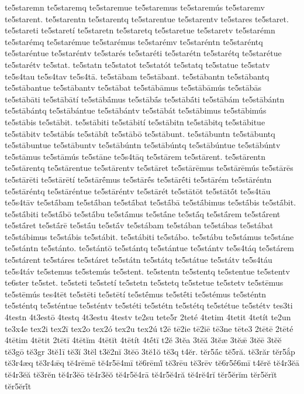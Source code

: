 {te5staremn
te5staremq
te5staremue
te5staremus
te5staremús
te5staremv
te5starent.
te5starentn
te5starentq
te5starentue
te5starentv
te5stares
te5staret.
te5stareti
te5staretí
te5staretn
te5staretq
te5staretue
te5staretv
te5starémn
te5starémq
te5starémue
te5starémus
te5starémv
te5staréntn
te5staréntq
te5staréntue
te5staréntv
te5starés
te5staréti
te5starétn
te5starétq
te5starétue
te5starétv
te5stat.
te5statn
te5statot
te5statót
te5statq
te5statue
te5statv
te5s4tau
te5s4tav
te5s4tā.
te5stābam
te5stābant.
te5stābantn
te5stābantq
te5stābantue
te5stābantv
te5stābat
te5stābāmus
te5stābāmús
te5stābās
te5stābāti
te5stābātí
te5stābā́mus
te5stābā́s
te5stābā́ti
te5stābám
te5stābántn
te5stābántq
te5stābántue
te5stābántv
te5stābát
te5stābimus
te5stābimús
te5stābis
te5stābit.
te5stābiti
te5stābití
te5stābitn
te5stābitq
te5stābitue
te5stābitv
te5stābís
te5stābít
te5stābō
te5stābunt.
te5stābuntn
te5stābuntq
te5stābuntue
te5stābuntv
te5stābúntn
te5stābúntq
te5stābúntue
te5stābúntv
te5stāmus
te5stāmús
te5stāne
te5s4tāq
te5stārem
te5stārent.
te5stārentn
te5stārentq
te5stārentue
te5stārentv
te5stāret
te5stārēmus
te5stārēmús
te5stārēs
te5stārēti
te5stārētí
te5stārḗmus
te5stārḗs
te5stārḗti
te5stārém
te5stāréntn
te5stāréntq
te5stāréntue
te5stāréntv
te5stārét
te5stātōt
te5stātṓt
te5s4tāu
te5s4tāv
te5stā́bam
te5stā́ban
te5stā́bat
te5stā́bā
te5stā́bimus
te5stā́bis
te5stā́bit.
te5stā́biti
te5stā́bō
te5stā́bu
te5stā́mus
te5stā́ne
te5stā́q
te5stā́rem
te5stā́rent
te5stā́ret
te5stā́rē
te5stā́u
te5stā́v
te5stábam
te5stában
te5stábas
te5stábat
te5stábimus
te5stábis
te5stábit.
te5stábiti
te5stábo.
te5stábu
te5stámus
te5stáne
te5stántn
te5stánto.
te5stántō
te5stántq
te5stántue
te5stántv
te5s4táq
te5stárem
te5stárent
te5stáres
te5stáret
te5státn
te5státq
te5státue
te5státv
te5s4táu
te5s4táv
te5stemus
te5stemús
te5stent.
te5stentn
te5stentq
te5stentue
te5stentv
te6ster
te5stet.
te5steti
te5stetí
te5stetn
te5stetq
te5stetue
te5stetv
te5stēmus
te5stēmús
tes4tēt
te5stēti
te5stētí
te5stḗmus
te5stḗti
te5stémus
te5sténtn
te5sténtq
te5sténtue
te5sténtv
te5stéti
te5stétn
te5stétq
te5stétue
te5stétv
tes3ti
4testn
4t3estō
4testq
4t3estu
4testv
te2su
tete5r
2teté
4tetim
4tetit
4tetít
te2un
te3x4e
tex2i
tex2ī
tex2o
tex2ó
tex2u
tex2ú
t2ē
tē2ie
tē2iē
tē3ne
tēte3
2tētē
2tēté
4tētim
4tētit
2tētī
4tētĭm
4tētĭt
4tētít
4tḗtī
t2ĕ
3tĕa
3tĕă
3tĕæ
3tĕǣ
3tĕē
3tĕĕ
tĕ3gō
tĕ3gr
3tĕ1ī
tĕ3ĭ
3tĕl
t3ĕ2nĭ
3tĕō
3tĕ1ŏ
tĕ3q
t4ĕr.
tĕr5ā́c
tĕ5ră.
tĕ3răr
tĕr5ắp
tĕ3r4æq
tĕ3r4ǣq
tĕ4rēmē
tĕ4r5ē4mī
tĕ6rēmĭ́
tĕ3rēu
tĕ3rēv
tĕ6r5ḗ6mī
t4ĕrĕ
tĕ4r3ĕā
tĕ4r3ĕă
tĕ3rĕn
tĕ4r3ĕō
tĕ4r3ĕŏ
tĕ4r5ĕ4rā
tĕ4r5ĕ4ră
tĕ4rĕ4rĭ
tĕr5ĕrĭm
tĕr5ĕrĭt
tĕr5ĕrĭ́t
}
